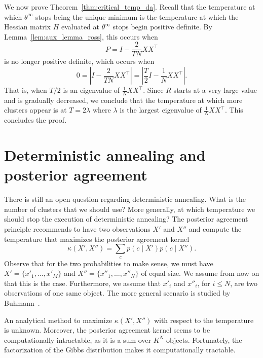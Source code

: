 We now prove Theorem~\ref{thm:critical_temp_da}. Recall that the temperature at which $\theta^\infty$ stops being the unique minimum is the temperature at which the Hessian matrix $H$ evaluated at $\theta^\infty$ stops begin positive definite. By Lemma~\ref{lem:aux_lemma_ross}, this occurs when 
%
\begin{equation}
P = I - \frac{2}{TN}XX^\top
\end{equation}
%
is no longer positive definite, which occurs when
%
\begin{equation}
0 = \left|I - \frac{2}{TN}XX^\top\right| = \left|\frac{T}{2}I - \frac{1}{N}XX^\top\right|.
\end{equation}
%
That is, when $T/2$ is an eigenvalue of $\frac{1}{N}XX^\top$. Since $R$ starts at a very
large value and is gradually decreased, we conclude that the temperature at
which more clusters appear is at $T = 2\lambda$ where $\lambda$ is the largest eigenvalue of $\frac{1}{N}XX^\top$. This concludes the proof.

\section{Deterministic annealing and posterior agreement}
\label{sec:da_pa}

There is still an open question regarding deterministic annealing. What
is the number of clusters that we should use? More generally, at which
temperature we should stop the execution of deterministic annealing? The
posterior agreement principle recommends to have two observations $X'$ and
$X''$ and compute the temperature that maximizes the posterior agreement
kernel
%
\begin{equation}
\kappa(X', X'') = \sum_c p(c \mid X') p(c \mid X'').
\end{equation}
%
Observe that for the two probabilities to make sense, we must have $X' = \{x'_1, \ldots, x'_M\}$ and $X'' = \{x''_1, \ldots, x''_N\}$ of equal size. We assume from
now on that this is the case. Furthermore, we assume that $x'_i$ and $x''_i$, for $i \leq N$, are
two observations of one same object. The more general scenario is studied
by Buhmann~\cite{buhmann2010information}.

An analytical method to maximize $\kappa(X', X'')$ with respect to the temperature
is unknown. Moreover, the posterior agreement kernel seems to
be computationally intractable, as it is a sum over $K^N$ objects. Fortunately,
the factorization of the Gibbs distribution makes it computationally
tractable.


